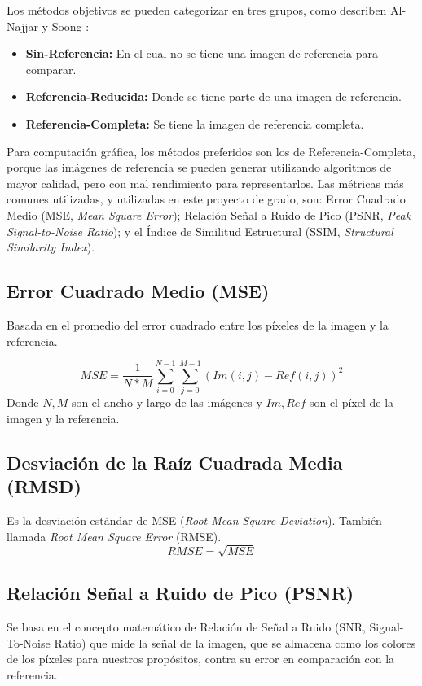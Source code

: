 \documentclass[pregrado]{tesis-usb} %
\begin{document}
Los métodos objetivos se pueden categorizar en tres grupos, como describen Al-Najjar y Soong \cite{Yusra2012}:

\begin{itemize}
	\item \textbf{Sin-Referencia:} En el cual no se tiene una imagen de referencia para comparar.
	\item \textbf{Referencia-Reducida:} Donde se tiene parte de una imagen de referencia.
	\item \textbf{Referencia-Completa:} Se tiene la imagen de referencia completa.
\end{itemize}



Para computación gráfica, los métodos preferidos son los de Referencia-Completa, porque las imágenes de referencia se pueden generar utilizando algoritmos de mayor calidad, pero con mal rendimiento para representarlos. Las métricas más comunes utilizadas, y utilizadas en este proyecto de grado, son: Error Cuadrado Medio (MSE, \textit{Mean Square Error}); Relación Señal a Ruido de Pico (PSNR, \textit{Peak Signal-to-Noise Ratio}); y el Índice de Similitud Estructural  (SSIM, \textit{Structural Similarity Index}).

\subsection{Error Cuadrado Medio (MSE)}
Basada en el promedio del error cuadrado entre los píxeles de la imagen y la referencia. 

\begin{equation}\label{eq:mse}
	MSE=\frac{1}{N*M}\sum\limits_{i=0}^{N-1}\sum\limits_{j=0}^{M-1}(Im(i,j)-Ref(i,j))^2
\end{equation}
Donde $N, M$ son el ancho y largo de las imágenes y $Im, Ref$ son el píxel de la imagen y la referencia.

\subsection{Desviación de la Raíz Cuadrada Media  (RMSD)}
Es la desviación estándar de MSE (\textit{Root Mean Square Deviation}). También llamada \textit{Root Mean Square Error} (RMSE).
\begin{equation}\label{eq:rmse}
RMSE=\sqrt{MSE}
\end{equation}

\subsection{Relación Señal a Ruido de Pico (PSNR)}
Se basa en el concepto matemático de Relación de Señal a Ruido (SNR, Signal-To-Noise Ratio) que mide la señal de la imagen, que se almacena como los colores de los píxeles para nuestros propósitos, contra su error en comparación con la referencia. \cite{Yusra2012}
\end{document}
